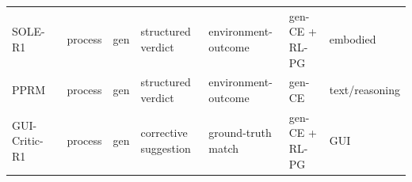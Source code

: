 \begin{table}[htbp]
{\begin{tabular}{@{}lllllll@{}}
SOLE-R1~\cite{Sch26}            & process & gen  & structured verdict        & environment-outcome                    & gen-CE + RL-PG  & embodied        \\
PPRM~\cite{Xu25h}               & process & gen  & structured verdict        & environment-outcome                    & gen-CE          & text/reasoning  \\
GUI-Critic-R1~\cite{Wan25q}     & process & gen  & corrective suggestion     & ground-truth match                     & gen-CE + RL-PG  & GUI             \\
\bottomrule
\end{tabular}%
}
\end{table}